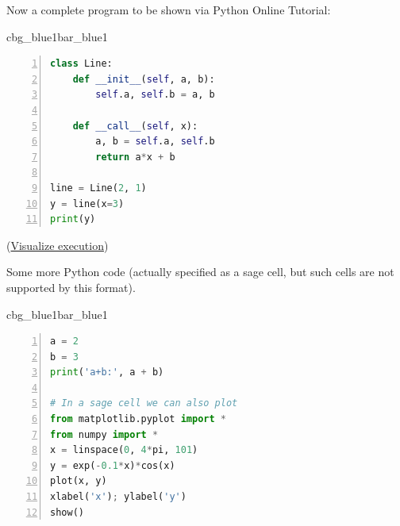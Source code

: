 \n\documentclass[%
oneside,                 %
final,                   %
10pt]{article}
\newenvironment{_pro_tight}[2]{
   \def\FrameCommand{\color{#2}\vrule width 1mm\normalcolor\colorbox{#1}}
   \FrameRule0.6pt\MakeFramed {\advance\hsize-2mm\FrameRestore}\vskip3mm}
   {\vskip0mm\endMakeFramed}
\newenvironment{pro}[2]{
\bgroup\rmfamily
\fboxsep=0mm\relax
\begin{_pro_tight}{#1}{#2}
\list{}{\parsep=-2mm\parskip=0mm\topsep=0pt\leftmargin=2mm
\rightmargin=2\leftmargin\leftmargin=4pt\relax}
\item\relax}
{\endlist\end{_pro_tight}\egroup}
\theoremstyle{definition}
\begin{document}
Now a complete program to be shown via Python Online Tutorial:













\begin{pro}{cbg_blue1}{bar_blue1}\begin{lstlisting}[language=python,style=myspeciallststyle,numbers=left,numberstyle=\tiny,stepnumber=3,numbersep=15pt,xleftmargin=1mm]
class Line:
    def __init__(self, a, b):
        self.a, self.b = a, b

    def __call__(self, x):
        a, b = self.a, self.b
        return a*x + b

line = Line(2, 1)
y = line(x=3)
print(y)

\end{lstlisting}\end{pro}
\noindent

\noindent
(\href{{https://pythontutor.com/visualize.html\#code=class+Line\%3A\%0A++++def+__init__\%28self\%2C+a\%2C+b\%29\%3A\%0A++++++++self.a\%2C+self.b+\%3D+a\%2C+b\%0A\%0A++++def+__call__\%28self\%2C+x\%29\%3A\%0A++++++++a\%2C+b+\%3D+self.a\%2C+self.b\%0A++++++++return+a\%2Ax+\%2B+b\%0A\%0Aline+\%3D+Line\%282\%2C+1\%29\%0Ay+\%3D+line\%28x\%3D3\%29\%0Aprint\%28y\%29&mode=display&cumulative=false&heapPrimitives=false&drawParentPointers=false&textReferences=false&py=2&curInstr=0}}{Visualize execution}) 


Some more Python code (actually specified as a sage cell, but
such cells are not supported by this format).














\begin{pro}{cbg_blue1}{bar_blue1}\begin{lstlisting}[language=python,style=myspeciallststyle,numbers=left,numberstyle=\tiny,stepnumber=3,numbersep=15pt,xleftmargin=1mm]
a = 2
b = 3
print('a+b:', a + b)

# In a sage cell we can also plot
from matplotlib.pyplot import *
from numpy import *
x = linspace(0, 4*pi, 101)
y = exp(-0.1*x)*cos(x)
plot(x, y)
xlabel('x'); ylabel('y')
show()

\end{lstlisting}\end{pro}
\noindent
\end{document}

